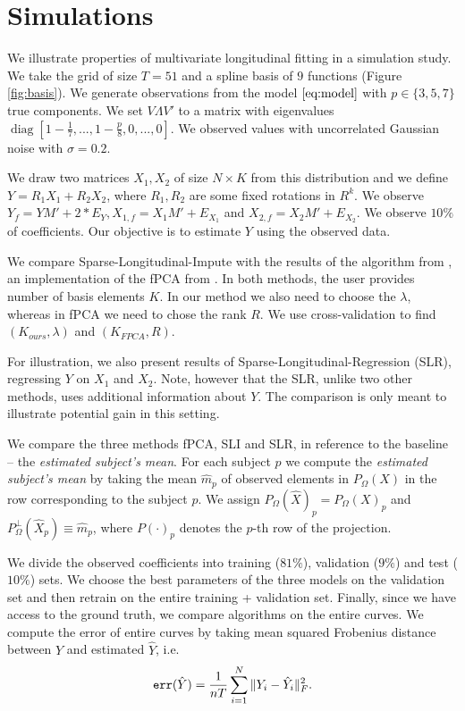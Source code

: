 \documentclass[preprint]{imsart}
\numberwithin{equation}{section}
\theoremstyle{plain}
\DeclareMathOperator*{\diag}{diag}
\begin{document}
\section{Simulations}\label{s:simulation}

We illustrate properties of multivariate longitudinal fitting in a simulation study. We take the grid of size $T = 51$ and a spline basis of $9$ functions (Figure \ref{fig:basis}). We generate observations from the model $\eqref{eq:model}$ with $p \in \{3,5,7\}$ true components. We set $V\Lambda V'$ to a matrix with eigenvalues $\diag[1-\frac{1}{7},...,1 - \frac{p}{8},0,...,0]$. We observed values with uncorrelated Gaussian noise with $\sigma = 0.2$. 

We draw two matrices $X_1,X_2$ of size $N \times K$ from this distribution and we define $Y = R_1 X_1 + R_2 X_2$, where $R_1,R_2$ are some fixed rotations in $R^k$. We observe $Y_f = YM' + 2* E_Y, X_{1,f} = X_1M' + E_{X_1}$ and $X_{2,f} = X_2 M' + E_{X_2}$. We observe $10\%$ of coefficients. Our objective is to estimate $Y$ using the observed data.

We compare Sparse-Longitudinal-Impute with the results of the algorithm from \citet{peng2009geometric}, an implementation of the fPCA from \citep{james2000principal}. In both methods, the user provides number of basis elements $K$. In our method we also need to choose the $\lambda$, whereas in fPCA we need to chose the rank $R$. We use cross-validation to find $(K_{ours},\lambda)$ and $(K_{FPCA},R)$.

For illustration, we also present results of Sparse-Longitudinal-Regression (SLR), regressing $Y$ on $X_1$ and $X_2$. Note, however that the SLR, unlike two other methods, uses additional information about $Y$. The comparison is only meant to illustrate potential gain in this setting.

We compare the three methods fPCA, SLI and SLR, in reference to the baseline -- the {\it estimated subject's mean}. For each subject $p$ we compute the {\it estimated subject's mean} by taking the mean $\hat{m}_p$ of observed elements in $P_\Omega(X)$ in the row corresponding to the subject $p$. We assign $P_\Omega(\hat{X})_p = P_\Omega(X)_p$ and $P^\perp_\Omega (\hat{X}_p) \equiv \hat{m}_p$, where $P(\cdot)_p$ denotes the $p$-th row of the projection.

We divide the observed coefficients into training ($81\%$), validation ($9\%$) and test ($10\%$) sets. We choose the best parameters of the three models on the validation set and then retrain on the entire training + validation set. Finally, since we have access to the ground truth, we compare algorithms on the entire curves. We compute the error of entire curves by taking mean squared Frobenius distance between $Y$ and estimated $\hat{Y}$, i.e.
\[
 \verb|err|(\hat{Y}) = \frac{1}{nT} \sum_{i=1}^N \|Y_i - \hat{Y}_i \|_F^2.
\]
\end{document}

